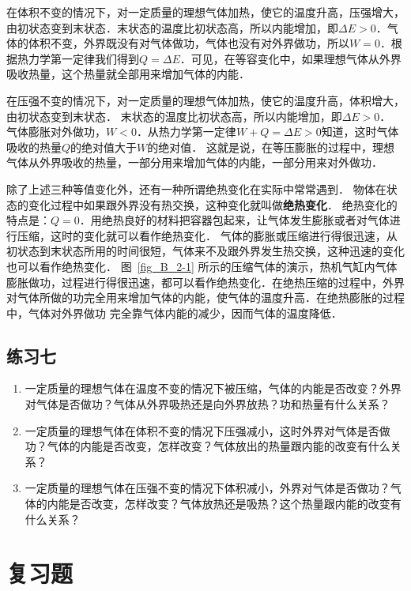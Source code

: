 在体积不变的情况下，对一定质量的理想气体加热，使它的温度升高，压强增大，由初状态变到末状态．末状态的温度比初状态高，所以内能增加，即$\Delta E>0$．气体的体积不变，外界既没有对气体做功，气体也没有对外界做功，所以$W=0$．根据热力学第一定律我们得到$Q=\Delta E$．可见，在等容变化中，如果理想气体从外界吸收热量，这个热量就全部用来增加气体的内能．

在压强不变的情况下，对一定质量的理想气体加热，使它的温度升高，体积增大，由初状态变到末状态．
末状态的温度比初状态高，所以内能增加，即$\Delta E>0$．
气体膨胀对外做功，$W<0$．从热力学第一定律$W+Q=\Delta E>0$知道，这时气体吸收的热量$Q$的绝对值大于$W$的绝对值．
这就是说，在等压膨胀的过程中，理想气体从外界吸收的热量，一部分用来增加气体的内能，一部分用来对外做功．

除了上述三种等值变化外，还有一种所谓绝热变化在实际中常常遇到．
物体在状态的变化过程中如果跟外界没有热交换，这种变化就叫做\textbf{绝热变化}．
绝热变化的特点是：$Q=0$．用绝热良好的材料把容器包起来，让气体发生膨胀或者对气体进行压缩，这时的变化就可以看作绝热变化．
气体的膨胀或压缩进行得很迅速，从初状态到末状态所用的时间很短，气体来不及跟外界发生热交换，这种迅速的变化也可以看作绝热变化．
图~\ref{fig_B_2-1} 所示的压缩气体的演示，热机气缸内气体膨胀做功，过程进行得很迅速，都可以看作绝热变化．在绝热压缩的过程中，外界对气体所做的功完全用来增加气体的内能，使气体的温度升高．在绝热膨胀的过程中，气体对外界做功
完全靠气体内能的减少，因而气体的温度降低．


\subsection*{练习七}
\begin{enumerate}
    \item 一定质量的理想气体在温度不变的情况下被压缩，气体的内能是否改变？外界对气体是否做功？气体从外界吸热还是向外界放热？功和热量有什么关系？
\item 一定质量的理想气体在体积不变的情况下压强减小，这时外界对气体是否做功？气体的内能是否改变，怎样改变？气体放出的热量跟内能的改变有什么关系？
\item 一定质量的理想气体在压强不变的情况下体积减小，外界对气体是否做功？气体的内能是否改变，怎样改变？气体放热还是吸热？这个热量跟内能的改变有什么关系？
\end{enumerate}



\section*{复习题}

